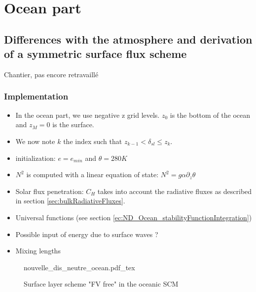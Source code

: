\section{Ocean part}
\subsection{Differences with the atmosphere and derivation of
	a symmetric surface flux scheme}
{\color{red} Chantier, pas encore retravaillé}
\subsubsection{Implementation}
\begin{itemize}
\item
In the ocean part, we use negative z grid levels.
$z_0$ is the bottom of the ocean and $z_{M}=0$ is the surface.
\item
We now note $k$ the index such that $z_{k-1} < \delta_{sl} \leq z_k$.
\item initialization: $e=e_{min}$ and $\theta = 280K$
\item $N^2$ is computed with a linear equation of state:
	$N^2 = g \alpha \partial_z \theta$
\item Solar flux penetration: $C_H$ takes into account the radiative
	fluxes as described in section \ref{sec:bulkRadiativeFluxes}.
\item Universal functions (see section
	\ref{ec:ND_Ocean_stabilityFunctionIntegration})
\item Possible input of energy due to surface waves ?
\item Mixing lengths

\end{itemize}
\begin{figure}
	{nouvelle_dis_neutre_ocean.pdf_tex}
	\caption{Surface layer scheme "FV free" in the oceanic SCM}
	\label{fig:ND_Ocean_nouvelle_dis_neutre}
\end{figure}

